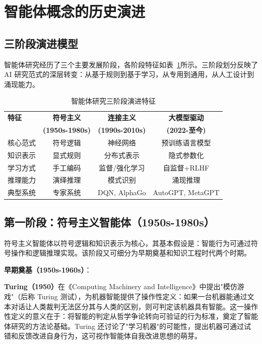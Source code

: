 \documentclass[12pt,a4paper]{article}
\begin{document}
\section{智能体概念的历史演进}
\label{sec:history}

\subsection{三阶段演进模型}

智能体研究经历了三个主要发展阶段，各阶段特征如表~\ref{tab:stages}所示。三阶段划分反映了 AI 研究范式的深层转变：从基于规则到基于学习，从专用到通用，从人工设计到涌现能力。

\begin{table}[h]
\centering
\caption{智能体研究三阶段演进特征}
\label{tab:stages}
\begin{tabular}{@{}lccc@{}}
\toprule
\textbf{特征} & \textbf{符号主义} & \textbf{连接主义} & \textbf{大模型驱动} \\
& \textbf{(1950s-1980s)} & \textbf{(1990s-2010s)} & \textbf{(2022-至今)} \\
\midrule
核心范式 & 符号逻辑 & 神经网络 & 预训练语言模型 \\
知识表示 & 显式规则 & 分布式表示 & 隐式参数化 \\
学习方式 & 手工编码 & 监督/强化学习 & 自监督+RLHF \\
推理能力 & 演绎推理 & 模式识别 & 涌现推理 \\
典型系统 & 专家系统 & DQN, AlphaGo & AutoGPT, MetaGPT \\
\bottomrule
\end{tabular}
\end{table}

\subsection{第一阶段：符号主义智能体（1950s-1980s）}

符号主义智能体以符号逻辑和知识表示为核心，其基本假设是：智能行为可通过符号操作和逻辑推理实现。该阶段又可细分为早期奠基和知识工程时代两个时期。

\textbf{早期奠基（1950s-1960s）}：

\textbf{Turing（1950）}在《Computing Machinery and Intelligence》中提出"模仿游戏"（后称 Turing 测试），为机器智能提供了操作性定义：如果一台机器能通过文本对话让人类裁判无法区分其与人类的区别，则可判定该机器具有智能。这一操作性定义的意义在于：将智能的判定从哲学争论转向可验证的行为标准，奠定了智能体研究的方法论基础。Turing 还讨论了"学习机器"的可能性，提出机器可通过试错和反馈改进自身行为，这可视作智能体自我改进思想的萌芽。
\end{document}
